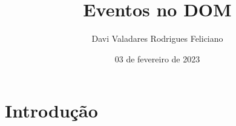 

\title[Eventos no DOM]{Eventos no DOM}
\author{Davi Valadares Rodrigues Feliciano}
\date{03 de fevereiro de 2023}



\section{Introdução}

\begin{frame}
  \maketitle
\end{frame}

